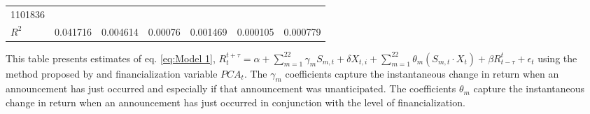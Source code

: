 \begin{sidewaystable}
{\begin{tabular}{@{}lllllllllllll@{}}
1101836 }                                                 \\ \textbf{$R^2$}             &\multicolumn{2}{c}{ 0.041716 }                                                 & \multicolumn{2}{c}{ 0.004614 }                                                 & \multicolumn{2}{c}{ 0.00076 }                                                 & \multicolumn{2}{c}{ 0.001469 }                                                 & \multicolumn{2}{c}{ 0.000105 }                                                   & \multicolumn{2}{c}{ 0.000779 }                                                 \\ \bottomrule 
\end{tabular}
}
\begin{tablenotes}\item 
    \singlespacing
    \footnotesize
    This table presents estimates of eq. \ref{eq:Model 1}, $R_{t}^{t+\tau}=\alpha+\sum_{m=1}^{22} \gamma_m S_{m,t}+ \delta X_{t,i} + \sum_{m=1}^{22} \theta_m (S_{m,t} \cdot X_t)+\beta R_{t-\tau}^{t}+\epsilon_{t}$ using the method proposed by \citet{andersen2007real} and financialization variable $PCA_t$. The $\gamma_m$ coefficients capture the instantaneous change in return when an announcement has just occurred and especially if that announcement was unanticipated. The coefficients $\theta_m$ capture the instantaneous change in return when an announcement has just occurred in conjunction with the level of financialization.
\end{tablenotes}
\end{sidewaystable}

